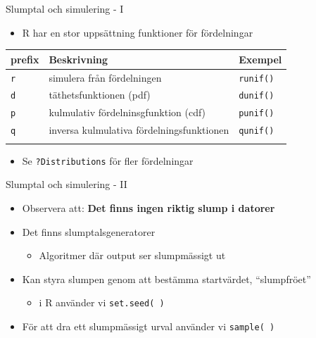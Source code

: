 \documentclass[
  11pt,
  ignorenonframetext,
  handout]{beamer}
\newcounter{none} %
\providecommand{\tightlist}{%
  \setlength{\itemsep}{0pt}\setlength{\parskip}{0pt}}
\newcommand\imp[1]{\alert{\textbf{#1}}}
\begin{document}
\begin{frame}[fragile]{Slumptal och simulering - I}
\protect{}\label{slumptal-och-simulering---i}
\begin{itemize}
\tightlist
\item
  R har en stor uppsättning funktioner för fördelningar
\end{itemize}

{\def\LTcaptype{none} %
\begin{longtable}[]{@{}lll@{}}
\toprule\noalign{}
prefix & Beskrivning & Exempel \\
\midrule\noalign{}
\endhead
\texttt{r} & simulera från fördelningen & \texttt{runif()} \\
\texttt{d} & täthetsfunktionen (pdf) & \texttt{dunif()} \\
\texttt{p} & kulmulativ fördelninsgfunktion (cdf) & \texttt{punif()} \\
\texttt{q} & inversa kulmulativa fördelningsfunktionen &
\texttt{qunif()} \\
\bottomrule\noalign{}
\end{longtable}
}

\begin{itemize}
\tightlist
\item
  Se \texttt{?Distributions} för fler fördelningar
\end{itemize}
\end{frame}

\begin{frame}{Slumptal och simulering - II}
\protect{}\label{slumptal-och-simulering---ii}
\begin{itemize}
\tightlist
\item
  Observera att: \imp{Det finns ingen riktig slump i datorer}
\item
  Det finns slumptalsgeneratorer

  \begin{itemize}
  \tightlist
  \item
    Algoritmer där output ser slumpmässigt ut
  \end{itemize}
\item
  Kan styra slumpen genom att bestämma startvärdet, ``slumpfröet''

  \begin{itemize}
  \tightlist
  \item
    i R använder vi \texttt{set.seed( )}
  \end{itemize}
\item
  För att dra ett slumpmässigt urval använder vi \texttt{sample( )}
\end{itemize}
\end{frame}
\end{document}
